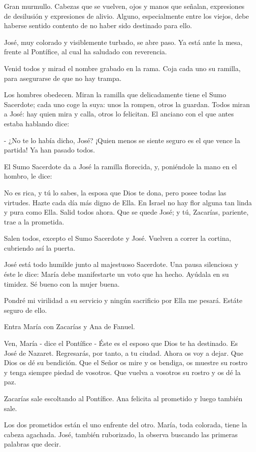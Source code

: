 \documentclass[12pt]{book} %
\begin{document}
Gran murmullo. Cabezas que se vuelven, ojos y manos que señalan, expresiones de desilusión y expresiones de alivio. Alguno, especialmente entre los viejos, debe haberse sentido contento de no haber sido destinado para ello. 

José, muy colorado y visiblemente turbado, se abre paso. Ya está ante la mesa, frente al Pontífice, al cual ha saludado con reverencia. 

Venid todos y mirad el nombre grabado en la rama. Coja cada uno su ramilla, para asegurarse de que no hay trampa. 

Los hombres obedecen. Miran la ramilla que delicadamente tiene el Sumo Sacerdote; cada uno coge la suya: unos la rompen, otros la guardan. Todos miran a José: hay quien mira y calla, otros lo felicitan. El anciano con el que antes estaba hablando dice: 

- ¿No te lo había dicho, José? ¡Quien menos se siente seguro es el que vence la partida! Ya han pasado todos. 

El Sumo Sacerdote da a José la ramilla florecida, y, poniéndole la mano en el hombro, le dice: 

No es rica, y tú lo sabes, la esposa que Dios te dona, pero posee todas las virtudes. Hazte cada día más digno de Ella. En Israel no hay flor alguna tan linda y pura como Ella. Salid todos ahora. Que se quede José; y tú, Zacarías, pariente, trae a la prometida. 

Salen todos, excepto el Sumo Sacerdote y José. Vuelven a correr la cortina, cubriendo así la puerta. 

José está todo humilde junto al majestuoso Sacerdote. Una pausa silenciosa y éste le dice: María debe manifestarte un voto que ha hecho. Ayúdala en su timidez. Sé bueno con la mujer buena. 

Pondré mi virilidad a su servicio y ningún sacrificio por Ella me pesará. Estáte seguro de ello. 

 Entra María con Zacarías y Ana de Fanuel. 

Ven, María - dice el Pontífice - Éste es el esposo que Dios te ha destinado. Es José de Nazaret. Regresarás, por tanto, a tu ciudad. Ahora os voy a dejar. Que Dios os dé su bendición. Que el Señor os mire y os bendiga, os muestre su rostro y tenga siempre piedad de vosotros. Que vuelva a vosotros su rostro y os dé la paz. 

Zacarías sale escoltando al Pontífice. Ana felicita al prometido y luego también sale. 

Los dos prometidos están el uno enfrente del otro. María, toda colorada, tiene la cabeza agachada. José, también ruborizado, la observa buscando las primeras palabras que decir. 
\end{document}

